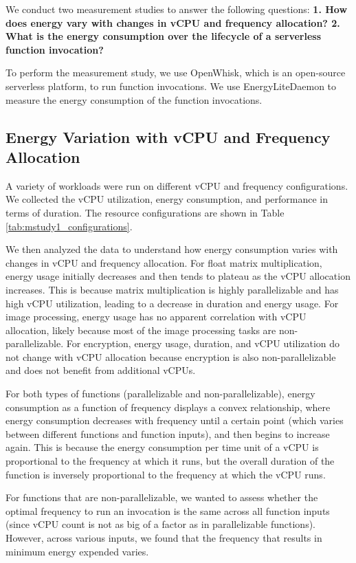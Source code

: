 \documentclass[times, 10pt,twocolumn]{article}
\begin{document}
We conduct two measurement studies to answer the following questions: \textbf{1. How does energy vary with changes in vCPU and frequency allocation? 2. What is the energy consumption over the lifecycle of a serverless function invocation?}

To perform the measurement study, we use OpenWhisk, which is an open-source serverless platform, to run function invocations. We use EnergyLiteDaemon to measure the energy consumption of the function invocations.

\subsection{Energy Variation with vCPU and Frequency Allocation}

A variety of workloads were run on different vCPU and frequency configurations. We collected the vCPU utilization, energy consumption, and performance in terms of duration. The resource configurations are shown in Table \ref{tab:mstudy1_configurations}.

We then analyzed the data to understand how energy consumption varies with changes in vCPU and frequency allocation. For float matrix multiplication, energy usage initially decreases and then tends to plateau as the vCPU allocation increases. This is because matrix multiplication is highly parallelizable and has high vCPU utilization, leading to a decrease in duration and energy usage. For image processing, energy usage has no apparent correlation with vCPU allocation, likely because most of the image processing tasks are non-parallelizable. For encryption, energy usage, duration, and vCPU utilization do not change with vCPU allocation because encryption is also non-parallelizable and does not benefit from additional vCPUs.

For both types of functions (parallelizable and non-parallelizable), energy consumption as a function of frequency displays a convex relationship, where energy consumption decreases with frequency until a certain point (which varies between different functions and function inputs), and then begins to increase again. This is because the energy consumption per time unit of a vCPU is proportional to the frequency at which it runs, but the overall duration of the function is inversely proportional to the frequency at which the vCPU runs. 

For functions that are non-parallelizable, we wanted to assess whether the optimal frequency to run an invocation is the same across all function inputs (since vCPU count is not as big of a factor as in parallelizable functions). However, across various inputs, we found that the frequency that results in minimum energy expended varies. 
\end{document}
